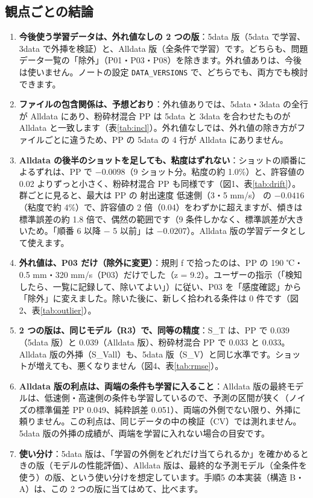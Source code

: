 \documentclass[paper=a4paper,fontsize=10.5pt,line_length=44zw,number_of_lines=38]{jlreq}
\begin{document}
\subsection{観点ごとの結論}
\begin{enumerate}[itemsep=0.6ex,topsep=0.6ex]
\item \textbf{今後使う学習データは、外れ値なしの 2 つの版}：5data 版（5data で学習、3data で外挿を検証）と、Alldata 版（全条件で学習）です。どちらも、問題データ一覧の「除外」（P01・P03・P08）を除きます。外れ値ありは、今後は使いません。ノートの設定 \texttt{DATA\_VERSIONS} で、どちらでも、両方でも検討できます。
\item \textbf{ファイルの包含関係は、予想どおり}：外れ値ありでは、5data・3data の全行が Alldata にあり、粉砕材混合 PP は 5data と 3data を合わせたものが Alldata と一致します（表\ref{tab:incl}）。外れ値なしでは、外れ値の除き方がファイルごとに違うため、PP の 5data の 4 行が Alldata にありません。
\item \textbf{Alldata の後半のショットを足しても、粘度はずれない}：ショットの順番によるずれは、PP で $-0.0098$（9 ショット分。粘度の約 1.0\%）と、許容値の 0.02 よりずっと小さく、粉砕材混合 PP も同様です（図1、表\ref{tab:drift}）。群ごとに見ると、最大は PP の 射出速度 低速側（3・5 mm/s） の $-0.0416$（粘度で約 4\%）で、許容値の 2 倍（0.04）をわずかに超えますが、傾きは標準誤差の約 1.8 倍で、偶然の範囲です（9 条件しかなく、標準誤差が大きいため。「順番 6 以降 $-$ 5 以前」は $-0.0207$）。Alldata 版の学習データとして使えます。
\item \textbf{外れ値は、P03 だけ（除外に変更）}：規則 f で拾ったのは、PP の 190 ℃・0.5 mm・320 mm/s（P03）だけでした（z = 9.2）。ユーザーの指示（「検知したら、一覧に記録して、除いてよい」）に従い、P03 を「感度確認」から「除外」に変えました。除いた後に、新しく拾われる条件は 0 件です（図2、表\ref{tab:outlier}）。
\item \textbf{2 つの版は、同じモデル（R3）で、同等の精度}：S\_T は、PP で 0.039（5data 版）と 0.039（Alldata 版）、粉砕材混合 PP で 0.033 と 0.033。Alldata 版の外挿（S\_Vall）も、5data 版（S\_V）と同じ水準です。ショットが増えても、悪くなりません（図4、表\ref{tab:rmse}）。
\item \textbf{Alldata 版の利点は、両端の条件も学習に入ること}：Alldata 版の最終モデルは、低速側・高速側の条件も学習しているので、予測の区間が狭く（ノイズの標準偏差 PP 0.049、純粋誤差 0.051）、両端の外側でない限り、外挿に頼りません。この利点は、同じデータの中の検証（CV）では測れません。5data 版の外挿の成績が、両端を学習に入れない場合の目安です。
\item \textbf{使い分け}：5data 版は、「学習の外側をどれだけ当てられるか」を確かめるときの版（モデルの性能評価）、Alldata 版は、最終的な予測モデル（全条件を使う）の版、という使い分けを想定しています。手順5 の本実装（構造 B・A）は、この 2 つの版に当てはめて、比べます。
\end{enumerate}
\end{document}
